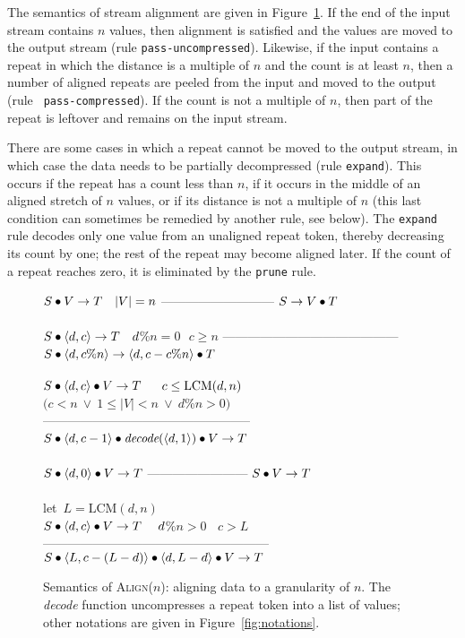 The semantics of stream alignment are given in
Figure~\ref{fig:stream-align}.  If the end of the input stream
contains $n$ values, then alignment is satisfied and the values are
moved to the output stream (rule {\tt pass-uncompressed}).  Likewise,
if the input contains a repeat in which the distance is a multiple of
$n$ and the count is at least $n$, then a number of aligned repeats
are peeled from the input and moved to the output (rule {\tt
  pass-compressed}).  If the count is not a multiple of $n$, then part
of the repeat is leftover and remains on the input stream.

There are some cases in which a repeat cannot be moved to the output
stream, in which case the data needs to be partially decompressed
(rule {\tt expand}).  This occurs if the repeat has a count less than
$n$, if it occurs in the middle of an aligned stretch of $n$ values,
or if its distance is not a multiple of $n$ (this last condition can
sometimes be remedied by another rule, see below).  The {\tt expand}
rule decodes only one value from an unaligned repeat token, thereby
decreasing its count by one; the rest of the repeat may become aligned
later.  If the count of a repeat reaches zero, it is eliminated by the
{\tt prune} rule.

\begin{figure}[t]
$S \bullet V \rightarrow T~~~|V|=n$\skiptopb
---------------------------\skipbot
$S \rightarrow V \bullet T$
~ \\ ~ \\
$S \bullet \langle d, c\rangle \rightarrow T~~~d$\%$n=0~~~c \ge n$\skiptopb
------------------------------------------\skipbot
$S \concat \tup{d}{c$\%$n} \rightarrow \tup{d}{c-c$\%$n} \concat T$
~ \\ ~ \\
$S \bullet \langle d, c\rangle \bullet V \rightarrow T~~~~~c\le\mbox{LCM}(d,n)$\\
$(c<n~\vee~1 \le |V|<n~\vee~d$\%$n>0)$\skiptopb
--------------------------------------------------\skipbot
$S \bullet \langle d, c-1\rangle \bullet \mbox{\it decode}(\langle d, 1\rangle) \bullet V \rightarrow T$
~ \\ ~ \\
$S \bullet \langle d, 0\rangle \bullet V \rightarrow T$\skiptopb
------------------------\skipbot
$S \bullet V \rightarrow T$
~ \\ ~ \\
let~$L=\mbox{LCM}(d,n)$\\
$S \bullet \langle d, c\rangle \bullet V \rightarrow T~~~~d$\%$n > 0~~~~c > L$\vspace{-3pt}\skiptopa
------------------------------------------------------\skipbot
$S \bullet \langle L, c-(L-d)\rangle \bullet \langle d, L-d\rangle \bullet V \rightarrow T$
\caption{Semantics of \textsc{Align}($n$): aligning data
to a granularity of $n$.  The \mbox{\it decode} function uncompresses
a repeat token into a list of values; other notations are given in
Figure~\ref{fig:notations}. \protect\label{fig:stream-align}}
\end{figure}

